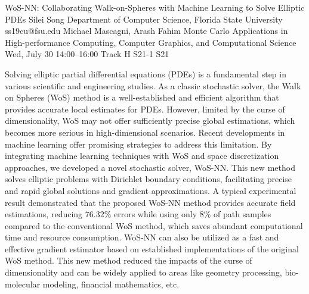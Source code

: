 \begin{talk}
  {WoS-NN: Collaborating Walk-on-Spheres with Machine Learning to Solve Elliptic PDEs}%
  {Silei Song}%
  {Department of Computer Science, Florida State University}%
  {ss19cu@fsu.edu}%
  {Michael Mascagni, Arash Fahim}%
  {Monte Carlo Applications in High-performance Computing, Computer Graphics, and Computational Science}%
  {Wed, July 30 14:00–16:00 Track H}%
  {S21-1}%
  {S21}%
				
			
Solving elliptic partial differential equations (PDEs) is a fundamental step in various scientific and engineering studies. As a classic stochastic solver, the Walk on Spheres (WoS) method is a well-established and efficient algorithm that provides accurate local estimates for PDEs. However, limited by the curse of dimensionality, WoS may not offer sufficiently precise global estimations, which becomes more serious in high-dimensional scenarios. Recent developments in machine learning offer promising strategies to address this limitation. By integrating machine learning techniques with WoS and space discretization approaches, we developed a novel stochastic solver, WoS-NN. This new method solves elliptic problems with Dirichlet boundary conditions, facilitating precise and rapid global solutions and gradient approximations. A typical experimental result demonstrated that the proposed WoS-NN method provides accurate field estimations, reducing $76.32\%$ errors while using only $8\%$ of path samples compared to the conventional WoS method, which saves abundant computational time and resource consumption. WoS-NN can also be utilized as a fast and effective gradient estimator based on established implementations of the original WoS method. This new method reduced the impacts of the curse of dimensionality and can be widely applied to areas like geometry processing, bio-molecular modeling, financial mathematics, etc.

\medskip

\end{talk}

